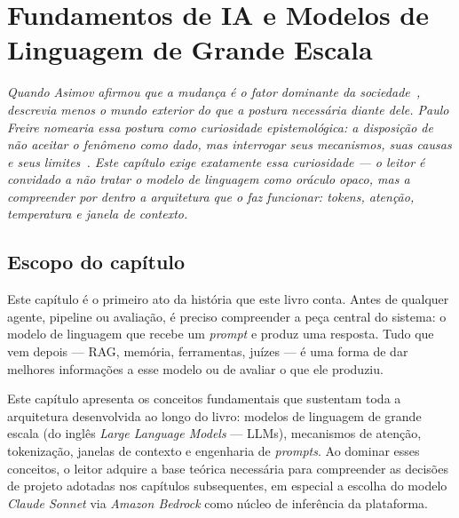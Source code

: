 \chapter{Fundamentos de IA e Modelos de Linguagem de Grande Escala}
\label{chap:fundamentos_llm_ia}

{\small\itshape\color{AccentGray}
Quando Asimov afirmou que a mudan\c{c}a \'{e} o fator dominante da sociedade~\cite{asimov1978myownview}, descrevia menos o mundo exterior do que a postura necess\'{a}ria diante dele. Paulo Freire nomearia essa postura como \textit{curiosidade epistemol\'{o}gica}: a disposi\c{c}\~{a}o de n\~{a}o aceitar o fen\^{o}meno como dado, mas interrogar seus mecanismos, suas causas e seus limites~\cite{freire1996autonomia}. Este cap\'{i}tulo exige exatamente essa curiosidade --- o leitor \'{e} convidado a n\~{a}o tratar o modelo de linguagem como or\'{a}culo opaco, mas a compreender por dentro a arquitetura que o faz funcionar: \textit{tokens}, aten\c{c}\~{a}o, temperatura e janela de contexto.\par}
\vspace{0.6em}
\section{Escopo do cap\'itulo}

Este cap\'itulo \'e o primeiro ato da hist\'oria que este livro conta.
Antes de qualquer agente, pipeline ou avalia\c{c}\~ao, \'e preciso
compreender a pe\c{c}a central do sistema: o modelo de linguagem que
recebe um \textit{prompt} e produz uma resposta. Tudo que vem depois
--- RAG, mem\'oria, ferramentas, juízes --- \'e uma forma de dar
melhores in\-for\-ma\-\c{c}\~oes a esse modelo ou de avaliar o que ele
produziu.

Este cap\'itulo apresenta os conceitos fundamentais que sustentam toda a
arquitetura desenvolvida ao longo do livro: modelos de linguagem de grande
escala (do ingl\^es \textit{Large Language Models} --- LLMs), mecanismos de
aten\c{c}\~ao, tokeniza\c{c}\~ao, janelas de contexto e engenharia de
\textit{prompts}. Ao dominar esses conceitos, o leitor adquire a base
te\'orica necess\'aria para compreender as decis\~oes de projeto adotadas
nos cap\'itulos subsequentes, em especial a escolha do modelo
\textit{Claude Sonnet} via \textit{Amazon Bedrock} como n\'ucleo de infer\^encia
da plataforma.

